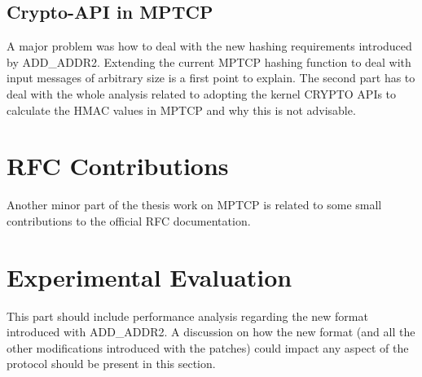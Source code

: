 \subsection{Crypto-API in MPTCP}
A major problem was how to deal with the new hashing requirements introduced by ADD\_ADDR2. Extending the current MPTCP hashing function to deal with input messages of arbitrary size is a first point to explain. The second part has to deal with the whole analysis related to adopting the kernel CRYPTO APIs to calculate the HMAC values in MPTCP and why this is not advisable.

\section{RFC Contributions}
Another minor part of the thesis work on MPTCP is related to some small contributions to the official RFC documentation.

\section{Experimental Evaluation}
This part should include performance analysis regarding the new format introduced with ADD\_ADDR2. A discussion on how the new format (and all the other modifications introduced with the patches) could impact any aspect of the protocol should be present in this section. 